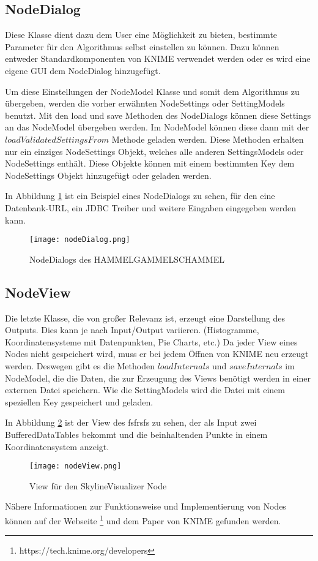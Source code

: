 \subsection{NodeDialog}
\label{ch:Analyse:sec:knime:subsec:nodeDialog}
Diese Klasse dient dazu dem User eine Möglichkeit zu bieten, bestimmte Parameter für den Algorithmus selbst einstellen zu können. 
Dazu können entweder Standardkomponenten von KNIME verwendet werden oder es wird eine eigene GUI dem NodeDialog hinzugefügt.

Um diese Einstellungen der NodeModel Klasse und somit dem Algorithmus zu übergeben, werden die vorher erwähnten NodeSettings oder SettingModels benutzt. Mit den load und save Methoden des NodeDialogs können diese Settings an das NodeModel übergeben werden. Im NodeModel können diese dann mit der $loadValidatedSettingsFrom$ Methode geladen werden. Diese Methoden erhalten nur ein einziges NodeSettings Objekt, welches alle anderen SettingsModels oder NodeSettings enthält. Diese Objekte können mit einem bestimmten Key dem NodeSettings Objekt hinzugefügt oder geladen werden.

In Abbildung \ref{img:nodeDialog} ist ein Beispiel eines NodeDialogs zu sehen, für den eine Datenbank-URL, ein JDBC Treiber und weitere Eingaben eingegeben werden kann.

\begin{figure}[H]
	\centering
	\texttt{[image: nodeDialog.png]}
	\caption{NodeDialogs des HAMMELGAMMELSCHAMMEL}
	\label{img:nodeDialog}
\end{figure}

\subsection{NodeView}
\label{ch:Analyse:sec:knime:subsec:nodeView}
Die letzte Klasse, die von großer Relevanz ist, erzeugt eine Darstellung des Outputs. Dies kann je nach Input/Output variieren. (Histogramme, Koordinatensysteme mit Datenpunkten, Pie Charts, etc.)
Da jeder View eines Nodes nicht gespeichert wird, muss er bei jedem Öffnen von KNIME neu erzeugt werden.
Deswegen gibt es die Methoden $loadInternals$ und $saveInternals$ im NodeModel, die die Daten, die zur Erzeugung des Views benötigt werden in einer externen Datei speichern. Wie die SettingModels wird die Datei mit einem speziellen Key gespeichert und geladen. 

In Abbildung \ref{img:nodeView} ist der View des fsfrsfs zu sehen, der als Input zwei BufferedDataTables bekommt und die beinhaltenden Punkte in einem Koordinatensystem anzeigt. 

\begin{figure}
	\centering
	\texttt{[image: nodeView.png]}
	\caption{View für den SkylineVisualizer Node}
	\label{img:nodeView}
\end{figure}

Nähere Informationen zur Funktionsweise und Implementierung von Nodes können auf der Webseite \footnote{https://tech.knime.org/developers} und dem Paper \cite{BCDG+07} von KNIME gefunden werden.
